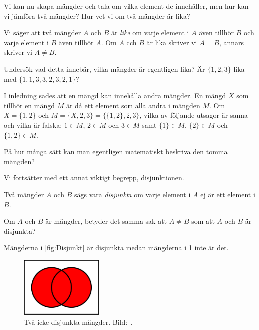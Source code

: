 Vi kan nu skapa mängder och tala om vilka element de innehåller, men hur kan vi
jämföra två mängder?
Hur vet vi om två mängder är lika?
\begin{definition}\label{def:Mangdlikhet}
  Vi säger att två mängder \(A\) och \(B\) är \emph{lika} om varje element i
  \(A\) även tillhör \(B\) och varje element i \(B\) även tillhör \(A\).
  Om \(A\) och \(B\) är lika skriver vi \(A=B\), annars skriver vi \(A\neq
  B\).
\end{definition}
\begin{exercise}\label{XrcLikhetMangd}
  Undersök vad detta innebär, vilka mängder är egentligen lika?
  Är \(\{1,2,3\}\) lika med \(\{1,1,3,3,2,3,2,1\}\)?
\end{exercise}
\begin{exercise}
  I inledning sades att en mängd kan innehålla andra mängder.
  En mängd \(X\) som tillhör en mängd \(M\) är då ett element som alla andra i
  mängden \(M\).
  Om \(X=\{1,2\}\) och \(M=\{X, 2, 3\}=\{\{1,2\},2,3\}\), vilka av följande
  utsagor är sanna och vilka är falska: 
  \(1\in M\), \(2\in M\) och \(3\in M\) samt \(\{1\}\in M\),
  \(\{2\}\in M\) och \(\{1,2\}\in M\).
\end{exercise}
\begin{exercise}\label{XrcBeskrivaTommaMangden}
  På hur många sätt kan man egentligen matematiskt beskriva den tomma
  mängden?
\end{exercise}

Vi fortsätter med ett annat viktigt begrepp, disjunktionen.
\begin{definition}\label{def:Disjunkt}
  Två mängder \(A\) och \(B\) sägs vara \emph{disjunkta} om varje element i
  \(A\) ej är ett element i \(B\).
\end{definition}
\begin{exercise}
  Om \(A\) och \(B\) är mängder, betyder det samma sak att \(A\neq B\) som
  att \(A\) och \(B\) är disjunkta?
\end{exercise}
Mängderna i \cref{fig:Disjunkt} är disjunkta medan mängderna 
i \cref{fig:IckeDisjunkt} inte är det.
\begin{figure}
  \includegraphics[width=4cm]{figs/union.pdf}
  \caption{%
    Två icke disjunkta mängder.
    Bild:~\cite{Wikipedia2013Set}.
  }\label{fig:IckeDisjunkt}
\end{figure}


